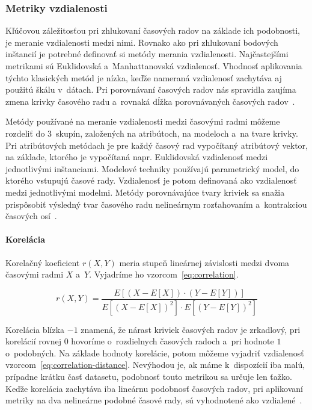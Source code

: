 \documentclass[a4paper,twoside,slovak,12pt,appendix]{article}
\begin{document}
\subsubsection{Metriky vzdialenosti}
\label{c:distance-metrics}
Kľúčovou záležitosťou pri zhlukovaní časových radov na základe ich podobnosti,
je meranie vzdialenosti medzi nimi. Rovnako ako pri zhlukovaní bodových
inštancií je potrebné definovať si metódy merania vzdialenosti. Najčastejšími
metrikami sú Euklidovská a~Manhattanovská vzdialenosť. Vhodnosť aplikovania
týchto klasických metód je nízka, keďže nameraná vzdialenosť zachytáva aj
použitú škálu v~dátach. Pri porovnávaní časových radov nás spravidla zaujíma
zmena krivky časového radu a~rovnaká dĺžka porovnávaných časových
radov~\cite{Dzeroski2007,WarrenLiao2005}.

Metódy používané na meranie vzdialenosti medzi časovými radmi môžeme rozdeliť do
3~skupín, založených na atribútoch, na modeloch a~na tvare krivky. Pri
atribútových metódach je pre každý časový rad vypočítaný atribútový vektor, na
základe, ktorého je vypočítaná napr. Euklidovská vzdialenosť medzi jednotlivými
inštanciami. Modelové techniky používajú parametrický model, do ktorého vstupujú
časové rady. Vzdialenosť je potom definovaná ako vzdialenosť medzi jednotlivými
modelmi. Metódy porovnávajúce tvary kriviek sa snažia prispôsobiť výsledný tvar
časového radu nelineárnym rozťahovaním a~kontrakciou časových
osí~\cite{Hautamaki2008}.


\paragraph{Korelácia}
Korelačný koeficient $r(X, Y)$ meria stupeň lineárnej závislosti medzi dvoma
časovými radmi $X$ a~$Y$. Vyjadríme ho vzorcom~\ref{eq:correlation}.

\begin{equation}
	\label{eq:correlation}
  r \left( X, Y \right) = \frac
  {E \left[ \left( X - E \left[ X \right] \right) \cdot \left( Y - E \left[ Y \right] \right) \right]}
  {E \left[ \left( X - E \left[ X \right] \right)^2 \right] \cdot E \left[ \left( Y - E \left[ Y \right] \right)^2 \right]}
\end{equation}

Korelácia blízka $-1$ znamená, že nárast kriviek časových radov je zrkadlový,
pri korelácií rovnej $0$ hovoríme o~rozdielnych časových radoch a~pri hodnote
$1$ o~podobných. Na základe hodnoty korelácie, potom môžeme vyjadriť vzdialenosť
vzorcom~\ref{eq:correlation-distance}. Nevýhodou je, ak máme k~dispozícií iba
malú, prípadne krátku časť datasetu, podobnosť touto metrikou sa určuje len
ťažko. Keďže korelácia zachytáva iba lineárnu podobnosť časových radov, pri
aplikovaní metriky na dva nelineárne podobné časové rady, sú vyhodnotené ako
vzdialené~\cite{Dzeroski2007}.
\end{document}
